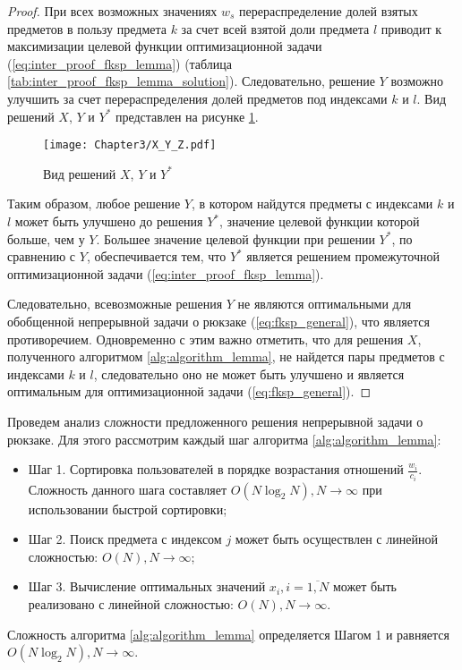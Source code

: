 \begin{proof}
При всех возможных значениях $w_s$ перераспределение долей взятых предметов в пользу предмета $k$ за счет всей взятой доли предмета $l$ приводит к максимизации целевой функции оптимизационной задачи (\ref{eq:inter_proof_fksp_lemma}) (таблица \ref{tab:inter_proof_fksp_lemma_solution}). Следовательно, решение $Y$ возможно улучшить за счет перераспределения долей предметов под индексами $k$ и $l$. Вид решений $X$, $Y$ и $Y^{*}$ представлен на рисунке \ref{fig:X_Y_Ys_Solutions}.

\begin{figure}[htbp]
\begin{center}
\texttt{[image: Chapter3/X\_Y\_Z.pdf]}
\caption{Вид решений $X$, $Y$ и $Y^{*}$}
\label{fig:X_Y_Ys_Solutions}
\end{center}
\end{figure}

Таким образом, любое решение $Y$, в котором найдутся предметы с индексами $k$ и $l$ может быть улучшено до решения $Y^{*}$, значение целевой функции которой больше, чем у $Y$. Большее значение целевой функции при решении $Y^{*}$, по сравнению с $Y$, обеспечивается тем, что $Y^{*}$ является решением промежуточной оптимизационной задачи (\ref{eq:inter_proof_fksp_lemma}).

Следовательно, всевозможные решения $Y$ не являются оптимальными для обобщенной непрерывной задачи о рюкзаке (\ref{eq:fksp_general}), что является противоречием. Одновременно с этим важно отметить, что для решения $X$, полученного алгоритмом \ref{alg:algorithm_lemma}, не найдется пары предметов с индексами $k$ и $l$, следовательно оно не может быть улучшено и является оптимальным для оптимизационной задачи (\ref{eq:fksp_general}).
\end{proof}

Проведем анализ сложности предложенного решения непрерывной задачи о рюкзаке. Для этого рассмотрим каждый шаг алгоритма \ref{alg:algorithm_lemma}:
\begin{itemize}
	\item Шаг 1. Сортировка пользователей в порядке возрастания отношений $\frac{w_i}{c_i}$. Сложность данного шага составляет $O(N \log_2 N), N\to\infty$ при использовании быстрой сортировки;
	\item Шаг 2. Поиск предмета с индексом $j$ может быть осуществлен с линейной сложностью: $O(N), N\to\infty$;
	\item Шаг 3. Вычисление оптимальных значений $x_i, i=\overline{1,N}$ может быть реализовано с линейной сложностью: $O(N), N\to\infty$.
\end{itemize}
Сложность алгоритма \ref{alg:algorithm_lemma} определяется Шагом 1 и равняется $O(N \log_2 N), N\to\infty$.

